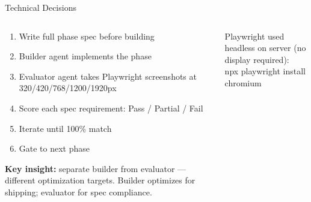 \documentclass[aspectratio=169,12pt]{beamer}
\newcommand{\codebox}[1]{%
  \colorbox{cardBg}{\small\ttfamily #1}%
}
\begin{document}
\begin{frame}[t,shrink=25]{Technical Decisions}
\begin{columns}[T]
      \begin{tcolorbox}[pantrybox,title={Build-Eval-Iterate Workflow}]
        {\footnotesize
        \begin{enumerate}[leftmargin=*,itemsep=4pt,label=\textbf{\arabic*.}]
          \item Write full phase spec before building
          \item Builder agent implements the phase
          \item Evaluator agent takes Playwright screenshots at 320/420/768/1200/1920px
          \item Score each spec requirement: Pass / Partial / Fail
          \item Iterate until 100\% match
          \item Gate to next phase
        \end{enumerate}
        \vspace{4pt}
        \textbf{Key insight:} separate builder from evaluator --- different optimization targets.
        Builder optimizes for shipping; evaluator for spec compliance.
        }
      \end{tcolorbox}
      \vspace{0.2cm}
      {\footnotesize\color{warmGray}
        Playwright used headless on server (no display required):\\
        \codebox{npx playwright install chromium}
      }
  \end{columns}
\end{frame}
\end{document}
